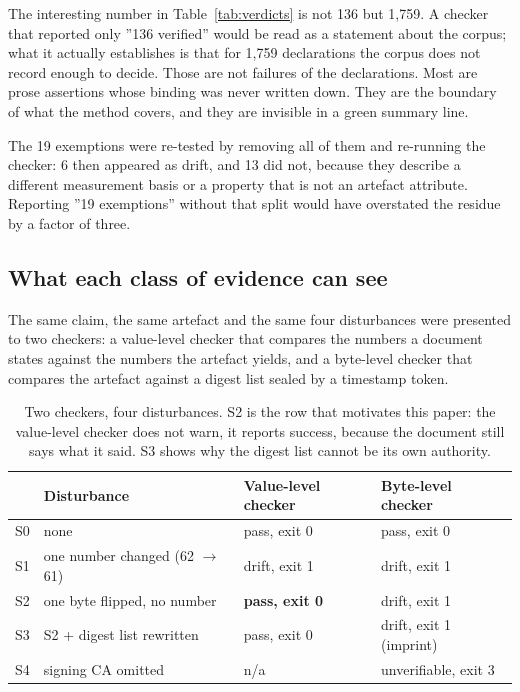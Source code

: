 The interesting number in Table~\ref{tab:verdicts} is not 136 but 1{,}759. A
checker that reported only ''136 verified'' would be read as a statement about
the corpus; what it actually establishes is that for 1{,}759 declarations the
corpus does not record enough to decide. Those are not failures of the
declarations. Most are prose assertions whose binding was never written down.
They are the boundary of what the method covers, and they are invisible in a
green summary line.

The 19 exemptions were re-tested by removing all of them and re-running the
checker: 6 then appeared as drift, and 13 did not, because they describe a
different measurement basis or a property that is not an artefact attribute.
Reporting ''19 exemptions'' without that split would have overstated the residue
by a factor of three.

\subsection{What each class of evidence can see}
\label{sec:eval-baseline}

The same claim, the same artefact and the same four disturbances were presented
to two checkers: a value-level checker that compares the numbers a document
states against the numbers the artefact yields, and a byte-level checker that
compares the artefact against a digest list sealed by a timestamp token.

\begin{table}[t]
\centering
\small
\begin{tabular}{@{}clll@{}}
\toprule
 & Disturbance & Value-level checker & Byte-level checker \\
\midrule
S0 & none                              & pass, exit 0        & pass, exit 0 \\
S1 & one number changed (62 $\to$ 61)  & drift, exit 1       & drift, exit 1 \\
S2 & one byte flipped, no number       & \textbf{pass, exit 0} & drift, exit 1 \\
S3 & S2 + digest list rewritten        & pass, exit 0        & drift, exit 1 (imprint) \\
S4 & signing CA omitted                & n/a                 & unverifiable, exit 3 \\
\bottomrule
\end{tabular}
\caption{Two checkers, four disturbances. S2 is the row that motivates this
paper: the value-level checker does not warn, it reports success, because the
document still says what it said. S3 shows why the digest list cannot be its own
authority.}
\label{tab:s0s4}
\end{table}

